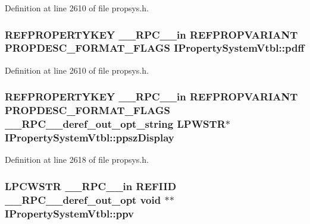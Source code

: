 Definition at line 2610 of file propsys.\+h.

\subsubsection[{\texorpdfstring{pdff}{pdff}}]{ {\bf R\+E\+F\+P\+R\+O\+P\+E\+R\+T\+Y\+K\+EY} {\bf \+\_\+\+\_\+\+R\+P\+C\+\_\+\+\_\+in} {\bf R\+E\+F\+P\+R\+O\+P\+V\+A\+R\+I\+A\+NT} {\bf P\+R\+O\+P\+D\+E\+S\+C\+\_\+\+F\+O\+R\+M\+A\+T\+\_\+\+F\+L\+A\+GS} I\+Property\+System\+Vtbl\+::pdff}\hypertarget{struct_i_property_system_vtbl_a46cf4861829f0e5218b681701c7a3a82}{}\label{struct_i_property_system_vtbl_a46cf4861829f0e5218b681701c7a3a82}


Definition at line 2610 of file propsys.\+h.

\subsubsection[{\texorpdfstring{ppsz\+Display}{ppszDisplay}}]{ {\bf R\+E\+F\+P\+R\+O\+P\+E\+R\+T\+Y\+K\+EY} {\bf \+\_\+\+\_\+\+R\+P\+C\+\_\+\+\_\+in} {\bf R\+E\+F\+P\+R\+O\+P\+V\+A\+R\+I\+A\+NT} {\bf P\+R\+O\+P\+D\+E\+S\+C\+\_\+\+F\+O\+R\+M\+A\+T\+\_\+\+F\+L\+A\+GS} {\bf \+\_\+\+\_\+\+R\+P\+C\+\_\+\+\_\+deref\+\_\+out\+\_\+opt\+\_\+string} {\bf L\+P\+W\+S\+TR}$\ast$ I\+Property\+System\+Vtbl\+::ppsz\+Display}\hypertarget{struct_i_property_system_vtbl_a1366e91871716f1dcd7b95fea170910a}{}\label{struct_i_property_system_vtbl_a1366e91871716f1dcd7b95fea170910a}


Definition at line 2618 of file propsys.\+h.

\subsubsection[{\texorpdfstring{ppv}{ppv}}]{ {\bf L\+P\+C\+W\+S\+TR} {\bf \+\_\+\+\_\+\+R\+P\+C\+\_\+\+\_\+in} {\bf R\+E\+F\+I\+ID} {\bf \+\_\+\+\_\+\+R\+P\+C\+\_\+\+\_\+deref\+\_\+out\+\_\+opt} {\bf void} $\ast$$\ast$ I\+Property\+System\+Vtbl\+::ppv}\hypertarget{struct_i_property_system_vtbl_abdbde6c1f99486480ea2e034033b4309}{}\label{struct_i_property_system_vtbl_abdbde6c1f99486480ea2e034033b4309}


